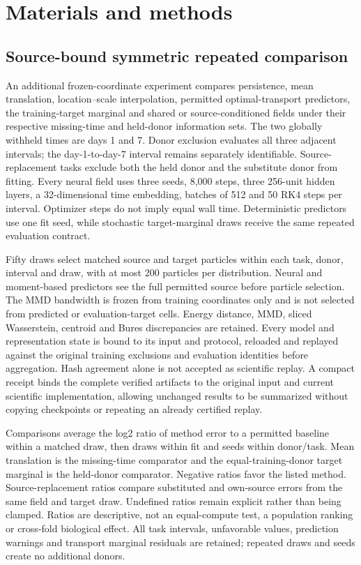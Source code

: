 \section{Materials and methods}
\subsection{Source-bound symmetric repeated comparison}
An additional frozen-coordinate experiment compares persistence, mean translation, location--scale interpolation, permitted optimal-transport predictors, the training-target marginal and shared or source-conditioned fields under their respective missing-time and held-donor information sets. The two globally withheld times are days 1 and 7. Donor exclusion evaluates all three adjacent intervals; the day-1-to-day-7 interval remains separately identifiable. Source-replacement tasks exclude both the held donor and the substitute donor from fitting. Every neural field uses three seeds, 8,000 steps, three 256-unit hidden layers, a 32-dimensional time embedding, batches of 512 and 50 RK4 steps per interval. Optimizer steps do not imply equal wall time. Deterministic predictors use one fit seed, while stochastic target-marginal draws receive the same repeated evaluation contract.

Fifty draws select matched source and target particles within each task, donor, interval and draw, with at most 200 particles per distribution. Neural and moment-based predictors see the full permitted source before particle selection. The MMD bandwidth is frozen from training coordinates only and is not selected from predicted or evaluation-target cells. Energy distance, MMD, sliced Wasserstein, centroid and Bures discrepancies are retained. Every model and representation state is bound to its input and protocol, reloaded and replayed against the original training exclusions and evaluation identities before aggregation. Hash agreement alone is not accepted as scientific replay. A compact receipt binds the complete verified artifacts to the original input and current scientific implementation, allowing unchanged results to be summarized without copying checkpoints or repeating an already certified replay.

Comparisons average the log2 ratio of method error to a permitted baseline within a matched draw, then draws within fit and seeds within donor/task. Mean translation is the missing-time comparator and the equal-training-donor target marginal is the held-donor comparator. Negative ratios favor the listed method. Source-replacement ratios compare substituted and own-source errors from the same field and target draw. Undefined ratios remain explicit rather than being clamped. Ratios are descriptive, not an equal-compute test, a population ranking or cross-fold biological effect. All task intervals, unfavorable values, prediction warnings and transport marginal residuals are retained; repeated draws and seeds create no additional donors.

